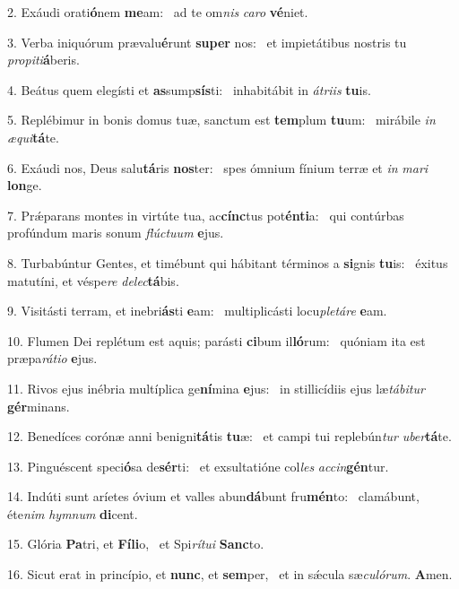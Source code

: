 2. Exáudi orati\textbf{ó}nem \textbf{me}am: \ast\  ad te om\textit{nis} \textit{ca}\textit{ro} \textbf{vé}niet.\

3. Verba iniquórum prævalu\textbf{é}runt \textbf{su}\textbf{per} nos: \ast\  et impietátibus nostris tu \textit{pro}\textit{pi}\textit{ti}\textbf{á}beris.\

4. Beátus quem elegísti et \textbf{as}sump\textbf{sís}ti: \ast\  inhabitábit in \textit{á}\textit{tri}\textit{is} \textbf{tu}is.\

5. Replébimur in bonis domus tuæ, sanctum est \textbf{tem}plum \textbf{tu}um: \ast\  mirábile \textit{in} \textit{æ}\textit{qui}\textbf{tá}te.\

6. Exáudi nos, Deus salu\textbf{tá}ris \textbf{nos}ter: \ast\  spes ómnium fínium terræ et \textit{in} \textit{ma}\textit{ri} \textbf{lon}ge.\

7. Prǽparans montes in virtúte tua, ac\textbf{cínc}tus pot\textbf{én}\textbf{ti}a: \ast\  qui contúrbas profúndum maris sonum \textit{flúc}\textit{tu}\textit{um} \textbf{e}jus.\

8. Turbabúntur Gentes, et timébunt qui hábitant términos a \textbf{si}gnis \textbf{tu}is: \ast\  éxitus matutíni, et véspe\textit{re} \textit{de}\textit{lec}\textbf{tá}bis.\

9. Visitásti terram, et inebri\textbf{ás}ti \textbf{e}am: \ast\  multiplicásti locu\textit{ple}\textit{tá}\textit{re} \textbf{e}am.\

10. Flumen Dei replétum est aquis; parásti \textbf{ci}bum il\textbf{ló}rum: \ast\  quóniam ita est præpa\textit{rá}\textit{ti}\textit{o} \textbf{e}jus.\

11. Rivos ejus inébria multíplica ge\textbf{ní}mina \textbf{e}jus: \ast\  in stillicídiis ejus læ\textit{tá}\textit{bi}\textit{tur} \textbf{gér}minans.\

12. Benedíces corónæ anni benigni\textbf{tá}tis \textbf{tu}æ: \ast\  et campi tui replebún\textit{tur} \textit{u}\textit{ber}\textbf{tá}te.\

13. Pinguéscent speci\textbf{ó}sa de\textbf{sér}ti: \ast\  et exsultatióne col\textit{les} \textit{ac}\textit{cin}\textbf{gén}tur.\

14. Indúti sunt aríetes óvium et valles abun\textbf{dá}bunt fru\textbf{mén}to: \ast\  clamábunt, éte\textit{nim} \textit{hym}\textit{num} \textbf{di}cent.\

15. Glória \textbf{Pa}tri, et \textbf{Fí}\textbf{li}o, \ast\  et Spi\textit{rí}\textit{tu}\textit{i} \textbf{Sanc}to.\

16. Sicut erat in princípio, et \textbf{nunc}, et \textbf{sem}per, \ast\  et in sǽcula sæ\textit{cu}\textit{ló}\textit{rum}. \textbf{A}men.\

